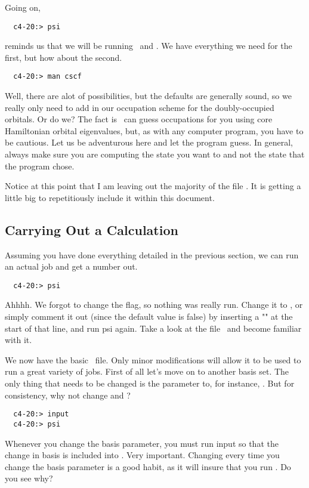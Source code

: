 Going on, 
\begin{verbatim}
  c4-20:> psi
\end{verbatim}
reminds us that we will be running \PSIcints\ and \PSIcscf. We have everything
we need for the first, but how about the second. 
\begin{verbatim}
  c4-20:> man cscf
\end{verbatim}
Well, there are alot of possibilities, but the defaults are generally
sound, so we really only need to add in our occupation scheme for
the doubly-occupied orbitals. Or do we? The fact is
\PSIcscf\ can guess occupations for you using
core Hamiltonian orbital eigenvalues, but, as with any computer
program, you have to be cautious. Let us be adventurous here and
let the program guess.
In general, always make sure you are computing the state you
want to and not the state that the program chose. 

Notice at this point that I am leaving out the
majority of the file . It is getting a little big
to repetitiously include it within this document. 

\subsection{Carrying Out a Calculation}
Assuming you have done everything detailed in the previous
section, we can run an actual job and get a number out. 
\begin{verbatim}
  c4-20:> psi
\end{verbatim}
Ahhhh. We forgot to change the  flag,
so nothing was really run. Change it to ,
or simply comment it out (since the default value is false) by inserting a "\keyword{ \%}" at
the start of that line, and run psi again. Take a look at the file \outputdat\
and become familiar with it. 

We now have the basic \ file. Only minor modifications will allow
it to be used to run a great variety of jobs. First
of all let's move on to another basis set. The only thing that needs to be
changed is the parameter \keyword{input:basis=sto-3g} to,
for instance, . But for consistency,
why not change  and ? 
\begin{verbatim}
  c4-20:> input
  c4-20:> psi
\end{verbatim}
Whenever you change the basis parameter, you must run input so that
the change in basis is included into \FILE30. Very important.
Changing  every time you
change the basis parameter is a good habit, as it will
insure that you run \PSIinput. Do you see why? 

